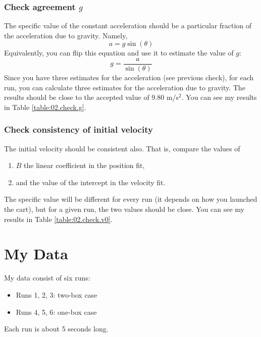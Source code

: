 \subsubsection{Check agreement $g$}
The specific value of the constant acceleration should be a particular fraction of the acceleration due to gravity. Namely,
\begin{equation}
    a = g \sin(\theta)
\end{equation}
Equivalently, you can flip this equation and use it to estimate the value of $g$:
\begin{equation}
    g = \frac{a}{\sin(\theta)}
\end{equation}
Since you have three estimates for the acceleration (see previous check), for each run, you can calculate three estimates for the acceleration due to gravity. The results should be close to the accepted value of 9.80 m/s$^{2}$. You can see my results in Table \ref{table:02.check.g}.
\subsubsection{Check consistency of initial velocity}
The initial velocity should be consistent also. That is, compare the values of
\begin{enumerate}
    \item $B$ the linear coefficient in the position fit,
    \item and the value of the intercept in the velocity fit.
\end{enumerate}
The specific value will be different for every run (it depends on how you launched the cart), but for a given run, the two values should be close. You can see my results in Table \ref{table:02.check.v0}.
\section{My Data}
My data consist of six runs:
\begin{itemize}
    \item Runs 1, 2, 3: two-box case
    \item Runs 4, 5, 6: one-box case
\end{itemize}
Each run is about 5 seconds long.
